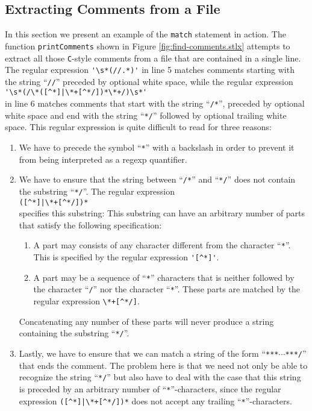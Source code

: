 \subsection{Extracting Comments from a File}
In this section we present an example of the  \texttt{match} statement in action.  The
function \texttt{printComments} shown in Figure \ref{fig:find-comments.stlx} attempts to
extract all those \texttt{C}-style comments from a file that are contained in a single
line.  The regular expression \verb|'\s*(//.*)'| in line 5 matches comments starting
with the string ``\texttt{//}'' preceded by optional white space, while the regular expression
\\[0.2cm]
\hspace*{1.3cm}
\verb"'\s*(/\*([^*]|\*+[^*/])*\*+/)\s*'"
\\[0.2cm]
in line 6 matches comments that start with the string ``\texttt{/*}'', preceded by optional
white space and end with the string ``\texttt{*/}'' followed by optional trailing white space.  This
regular expression is quite difficult to read for three reasons:
\begin{enumerate}
\item We have to precede the symbol ``\texttt{*}'' with a backslash in order to prevent it
      from being interpreted as a regexp quantifier.
\item We have to ensure that the string between  ``\texttt{/*}'' and ``\texttt{*/}'' does
      not contain the substring ``\texttt{*/}''.  The regular expression
      \\[0.2cm]
      \hspace*{1.3cm}
      \verb"([^*]|\*+[^*/])*"
      \\[0.2cm]
      specifies this substring:  This substring can have an arbitrary number of parts
      that satisfy the following specification:
      \begin{enumerate}
      \item A part may consists of any character different from
            the character ``\texttt{*}''.  This is specified by the regular expression
            \verb"'[^*]'".
      \item A part may be a sequence of ``\texttt{*}'' characters
            that is neither followed by the character ``\texttt{/}'' nor the character
            ``\texttt{*}''.   These parts are matched by the regular expression
            \verb"\*+[^*/]".
      \end{enumerate}
      Concatenating any number of these parts will never produce a string containing the
      substring ``\texttt{*/}''.
\item Lastly, we have to ensure that we can match a string of the form
      ``\texttt{***}$\cdots$\texttt{***/}'' that ends the comment.  The problem here is that
      we need not only be able to recognize the string ``\texttt{*/}'' but also have to deal with
      the case that this string is preceded by an arbitrary number of ``\texttt{*}''-characters,
      since the regular expression \verb"([^*]|\*+[^*/])*" does not accept any trailing
      ``\texttt{*}''-characters. 
\end{enumerate}

